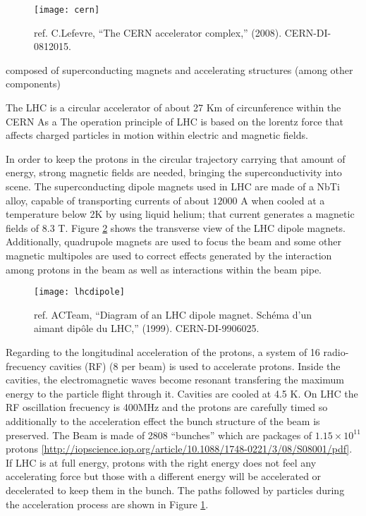\begin{figure}[!h]
  \centering
  \texttt{[image: cern]}
  \caption {ref. C.Lefevre, ``The CERN accelerator complex,'' (2008). CERN-DI-0812015.  }\label{cern}
\end{figure}

 composed of superconducting magnets and accelerating structures (among other components)




\noindent The LHC is a circular accelerator of about 27 Km of circunference within the CERN   As a The operation principle of LHC is based on the lorentz force that affects charged particles in motion within electric and magnetic fields.    



In order to keep the protons in the circular trajectory carrying that amount of energy, strong magnetic fields are needed, bringing the superconductivity into scene. The superconducting dipole magnets used in LHC are made of a NbTi alloy, capable of transporting currents of about $12000$ A when cooled at a temperature below 2K by using liquid helium; that current generates a magnetic fields of 8.3 T. Figure \ref{lhcdipole} shows the transverse view of the LHC dipole magnets. Additionally, quadrupole magnets are used to focus the beam and some other magnetic multipoles are used to correct effects generated by the interaction among protons in the beam as well as interactions within the beam pipe.

\begin{figure}[!h]
\centering
\texttt{[image: lhcdipole]}
\caption {ref. ACTeam, ``Diagram of an LHC dipole magnet. Sch\'ema d'un aimant dip\^ole du LHC,'' (1999). CERN-DI-9906025. }\label{lhcdipole}
\end{figure}

\noindent Regarding to the longitudinal acceleration of the protons, a system of 16 radio-frecuency cavities (RF) (8 per beam) is used to accelerate protons. Inside the cavities, the electromagnetic waves become resonant transfering the maximum energy to the particle flight through it. Cavities are cooled at 4.5 K. On LHC the RF oscillation frecuency is 400MHz and the protons are carefully timed so additionally to the acceleration effect the bunch structure of the beam is preserved. The Beam is made of 2808 ``bunches'' which are packages of $1.15 \times 10^11$ protons \ref{http://iopscience.iop.org/article/10.1088/1748-0221/3/08/S08001/pdf}. If LHC is at full energy, protons with the right energy does not feel any accelerating force but those with a different energy will be accelerated or decelerated to keep them in the bunch. The paths followed by particles during the acceleration process are shown in Figure \ref{cern}.


